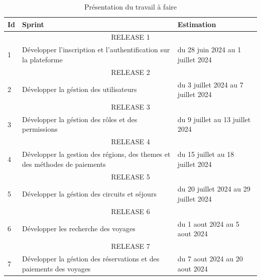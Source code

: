 \documentclass[12pt]{report}
\begin{document}
				\begin{longtable}{|p{1cm}|p{7cm}|p{6cm}|} 
						\caption{Présentation du travail à faire} 
						\label{tab:TravailAFaire}\\ 
						\hline 
						\textbf{Id} & \textbf{Sprint} & \textbf{Estimation} \\ 
						\hline 
						\endfirsthead 	
						\endhead
						\multicolumn{3}{|c|}{RELEASE 1}\\
						\hline

						1 & Développer l'inscription et l'authentification sur la plateforme & du 28 juin 2024 au 1 juillet 2024\\
						\hline
						\multicolumn{3}{|c|}{RELEASE 2}\\
						
						\hline
						2 & Développer la géstion des utilisateurs & du 3 juillet 2024 au 7 juillet 2024\\

						\hline
						\multicolumn{3}{|c|}{RELEASE 3}\\
												
						\hline
						3 & Développer la géstion des rôles et des permissions& du 9 juillet au 13 juillet 2024\\

						\hline
						\multicolumn{3}{|c|}{RELEASE 4}\\
						
						\hline
						4 &Développer la gestion des régions, des themes et des méthodes de paiements & du 15 juillet au 18 juillet 2024\\
											
						\hline
						\multicolumn{3}{|c|}{RELEASE 5}\\
						\hline
						5 & Développer la géstion des circuits et séjours & du 20 juillet 2024 au 29 juillet 2024\\

						\hline
						\multicolumn{3}{|c|}{RELEASE 6}\\
						\hline
						6 & Développer les recherche des voyages & du 1 aout 2024 au 5 aout 2024\\

						\hline
						\multicolumn{3}{|c|}{RELEASE 7}\\
						\hline
						7 & Développer la géstion des réservations et des paiements des voyages & du 7 aout 2024 au 20 aout 2024\\
						

\end{longtable}
\end{document}
